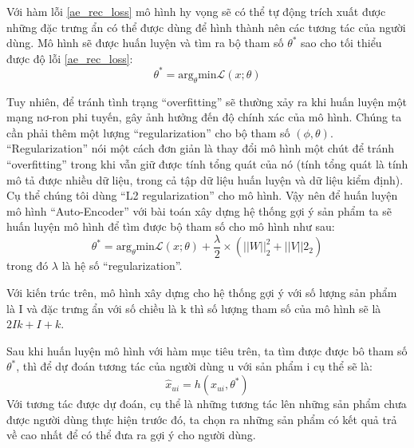     Với hàm lỗi \ref{ae_rec_loss} mô hình hy vọng sẽ có thể tự động trích xuất được những đặc trưng ẩn có thể được dùng để hình thành nên các tương tác của người dùng.
    Mô hình sẽ được huấn luyện và tìm ra bộ tham số $\theta^*$ sao cho tối thiểu được độ lỗi \ref{ae_rec_loss}: 
    \begin{equation}
        \theta^* = \text{arg}_\theta \text{min}  \mathcal{L}(x;\theta)
    \end{equation}    
    

    Tuy nhiên, để tránh tình trạng ``overfitting'' sẽ thường xảy ra khi huấn luyện một mạng nơ-ron phi tuyến, gây ảnh hưởng đến độ chính xác của mô hình. 
    Chúng ta cần phải thêm một lượng ``regularization'' cho bộ tham số $(\phi,\theta)$.
    ``Regularization'' nói một cách đơn giản là thay đổi mô hình một chút để tránh ``overfitting'' trong khi vẫn giữ được tính tổng quát của nó (tính tổng quát là tính mô tả được nhiều dữ liệu, trong cả tập dữ liệu huấn luyện và dữ liệu kiểm định).
    Cụ thể chúng tôi dùng ``L2 regularization'' cho mô hình.
    Vậy nên để huấn luyện mô hình ``Auto-Encoder'' với bài toán xây dựng hệ thống gợi ý sản phẩm ta sẽ huấn luyện mô hình để tìm được bộ tham số cho mô hình  như sau:
    \begin{equation}
        \label{ae_rec_obj}
        \theta^* = \text{arg}_\theta \text{min}  \mathcal{L}(x;\theta)  + \frac \lambda 2 \times (||W||^2_2 + ||V||2_2)
    \end{equation}
    trong đó $\lambda$ là hệ số ``regularization''.

    Với kiến trúc trên, mô hình xây dựng cho hệ thống gợi ý với số lượng sản phẩm là I và đặc trưng ẩn với số chiều là k thì số lượng tham số của mô hình sẽ là $2Ik + I + k$.
    
    Sau khi huấn luyện mô hình với hàm mục tiêu trên, ta tìm được được bô tham số $\theta^*$, thì để dự đoán tương tác của người dùng u với sản phẩm i cụ thể sẽ là: 
    $$\widehat{x}_{ui} = h(x_{ui},\theta^*)$$
    Với tương tác được dự đoán, cụ thể là những tương tác lên những sản phẩm chưa được người dùng thực hiện trước đó, ta chọn ra những sản phẩm có kết quả trả về cao nhất để có thể đưa ra gợi ý cho người dùng. 


